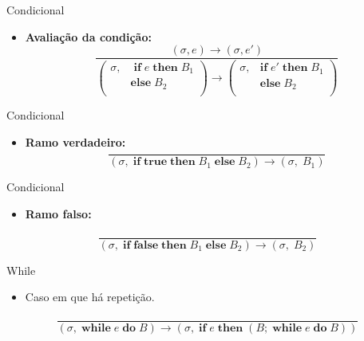 \begin{frame}{Condicional}

    \begin{itemize}

        \item
        \textbf{Avaliação da condição:}
        \[\frac{(\sigma, e) \to (\sigma, e')}{\left(\begin{array}{ll}
        \sigma,&\; \mathbf{if}\; e\; \mathbf{then}\; B_1\\
        & \mathbf{else}\; B_2\\
    \end{array}\right) \to \left(\begin{array}{ll}\sigma,& \mathbf{if}\; e'\; \mathbf{then}\; B_1\\
    & \mathbf{else}\; B_2\\
\end{array}\right)}
\]
\end{itemize}
\end{frame}

\begin{frame}{Condicional}

    \begin{itemize}

        \item
        \textbf{Ramo verdadeiro:}
        \[\frac{}{(\sigma,\; \mathbf{if}\; \mathbf{true}\; \mathbf{then}\; B_1\; \mathbf{else}\; B_2) \to (\sigma,\; B_1)}\]
    \end{itemize}
\end{frame}

\begin{frame}{Condicional}

    \begin{itemize}

        \item
        \textbf{Ramo falso:}
    \end{itemize}

    \[\frac{}{(\sigma,\; \mathbf{if}\; \mathbf{false}\; \mathbf{then}\; B_1\; \mathbf{else}\; B_2) \to (\sigma,\; B_2)}
    \]
\end{frame}

\begin{frame}{While}

    \begin{itemize}

        \item
        Caso em que há repetição.
    \end{itemize}

    \[\frac{}{(\sigma,\; \mathbf{while}\; e\; \mathbf{do}\; B) \to
    (\sigma,\; \mathbf{if}\; e\; \mathbf{then}\; (B;\; \mathbf{while}\; e\; \mathbf{do}\; B))}
    \]
\end{frame}


